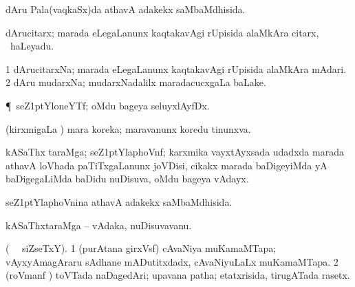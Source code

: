 \bentry
{} 
\gl{\gu} 
\bmng
dAru Pala(vaqkaSx)da athavA adakekx saMbaMdhisida.
\emng
\eentry

\bentry
{} 
\gl{\nA}
\bmng
dArucitarx; marada eLegaLanunx kaqtakavAgi rUpisida alaMkAra citarx, \kanmu\ haLeyadu.
\emng
\eentry

\bentry
{} 
\gl{\nA} 
\bmng
\bnum
\num{1} dArucitarxNa; marada  eLegaLanunx kaqtakavAgi rUpisida alaMkAra mAdari. 
\num{2} dAru mudarxNa; mudarxNadalilx maradacucxgaLa baLake.
\enum
\emng
\eentry

\bentry
{} 
\gl{\nA} 
\bmng
\P\ seZ\kern1ptYloneYTf; oMdu bageya seluyxlAyfDx.
\emng
\eentry

\bentry
{} 
\gl{\gu} 
\bmng
(kirxmigaLa \vi) mara  koreka; maravanunx koredu tinunxva.
\emng 
\eentry

\bentry
{}  
\gl{\nA}
\bmng
kASaThx taraMga; seZ\kern1ptYlaphoVnf; karxmika vayxtAyxsada udadxda  marada athavA loVhada paTiTxgaLanunx joVDisi, cikakx marada baDigeyiMda yA baDigegaLiMda baDidu   nuDisuva, oMdu bageya vAdayx. \quad {}
\emng
\eentry

\bentry
{}  
\gl{\gu} 
\bmng
seZ\kern1ptYlaphoVnina athavA adakekx  saMbaMdhisida.
\emng
\eentry

\bentry
{} 
\gl{\nA}
\bmng
kASaThxtaraMga -- vAdaka, nuDisuvavanu.
\emng 
\eentry

\bentry
{}
\gl{\nA}
\bmng
(\bava\   \ucAcx\ siZseTxY).
\bnum
\num{1} (purAtana girxVsf) cAvaNiya muKamaMTapa; vAyxyAmagAraru sAdhane mADutitxdadx, cAvaNiyuLaLx muKamaMTapa. 
\num{2} (roVmanf \pArxca) toVTada naDagedAri; upavana patha; etatxrisida, tirugATada rasetx.
\enum
\emng
\eentry

%

